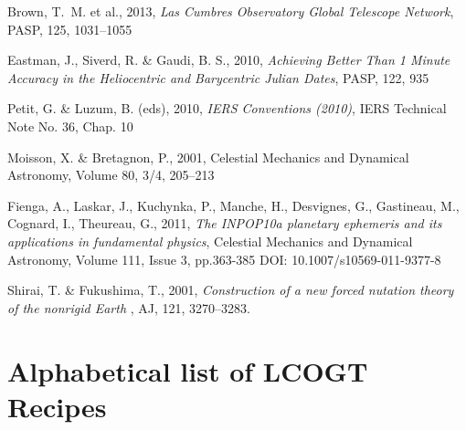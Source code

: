\documentclass[twoside,11pt]{article}
\newcommand{\htmlref}[2]{#1}
\newcommand{\xlabel}[1]{}
\renewcommand{\_}{\texttt{\symbol{95}}}
\newlength{\menuwidth}
\newlength{\menuindent}
\newcommand{\menuitem}[2]
  {{\bf #1} \settowidth{\menuwidth}{{\bf #1} }
  \setlength{\menuindent}{-0.5em}
  \addtolength{\menuwidth}{-2\menuwidth}
  \addtolength{\menuwidth}{\textwidth}
  \addtolength{\menuwidth}{\menuindent}
  \hspace{\menuindent}\parbox[t]{\menuwidth}{
  \renewcommand{\baselinestretch}{0.75}\small
  #2 \par \vspace{1.0ex}
  \renewcommand{\baselinestretch}{1.0}\normalsize} \\ }
\newcommand{\menuitem}[2]
  {\item [\htmlref{#1}{#1}] #2}
\begin{document}
\begin{thebibliography}{}
 Brown, T.~M. et al., 2013, \textit{Las Cumbres
Observatory Global Telescope Network}, PASP, 125, 1031--1055

 Eastman, J., Siverd, R. \& Gaudi, B. S., 2010, \textit{Achieving Better Than 1 Minute Accuracy in the Heliocentric and Barycentric
Julian Dates}, PASP, 122, 935

 Petit, G. \& Luzum, B. (eds), 2010, \textit{IERS Conventions
(2010)}, IERS Technical Note No. 36, Chap. 10

 Moisson, X. \& Bretagnon, P., 2001, Celestial Mechanics and
Dynamical Astronomy, Volume 80, 3/4, 205--213

 Fienga, A., Laskar, J., Kuchynka, P., Manche, H., Desvignes,
G., Gastineau, M., Cognard, I., Theureau, G., 2011, \textit{The INPOP10a
planetary ephemeris and its applications in fundamental physics}, 
Celestial Mechanics and Dynamical Astronomy, Volume 111, Issue 3, pp.363-385
DOI: 10.1007/s10569-011-9377-8

 Shirai, T. \& Fukushima, T., 2001, \textit{Construction of a
new forced nutation theory of the nonrigid Earth }, AJ, 121, 3270--3283. 
\end{thebibliography}

\newpage
\appendix

\section{\xlabel{ap_list}Alphabetical list of LCOGT Recipes\label{ap:list}}
\begin{htmlonly}
\end{htmlonly}
\end{document}
